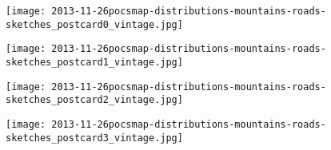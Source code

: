 
  
\texttt{[image: 2013-11-26pocsmap-distributions-mountains-roads-sketches\_postcard0\_vintage.jpg]}

\texttt{[image: 2013-11-26pocsmap-distributions-mountains-roads-sketches\_postcard1\_vintage.jpg]}

\texttt{[image: 2013-11-26pocsmap-distributions-mountains-roads-sketches\_postcard2\_vintage.jpg]}

\texttt{[image: 2013-11-26pocsmap-distributions-mountains-roads-sketches\_postcard3\_vintage.jpg]}
